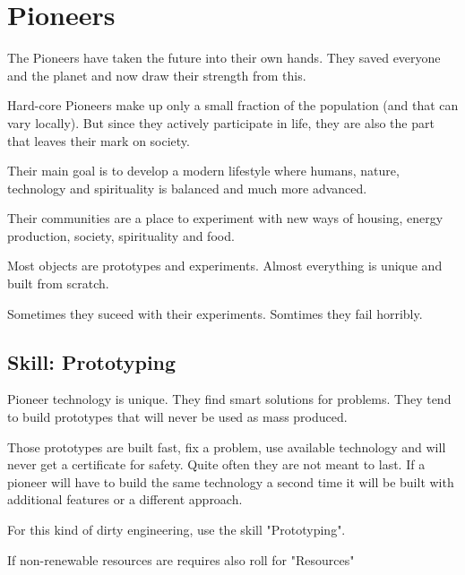\section{Pioneers}

The Pioneers have taken the future into their own hands. They saved everyone and the planet and now draw their strength from this.

Hard-core Pioneers make up only a small fraction of the population (and that can vary locally). But since they actively participate in life, they are also the part that leaves their mark on society.

Their main goal is to develop a modern lifestyle where humans, nature, technology and spirituality is balanced and much more advanced.

Their communities are a place to experiment with new ways of housing, energy production, society, spirituality and food.

Most objects are prototypes and experiments. Almost everything is unique and built from scratch.

Sometimes they suceed with their experiments. Somtimes they fail horribly.


\subsection{Skill: Prototyping}

Pioneer technology is unique. They find smart solutions for problems. They tend to build prototypes that will never be used as mass produced.

Those prototypes are built fast, fix a problem, use available technology and will never get a certificate for safety.
Quite often they are not meant to last.
If a pioneer will have to build the same technology a second time it will be built with additional features or a different approach.

For this kind of dirty engineering, use the skill "Prototyping".

If non-renewable resources are requires also roll for "Resources"